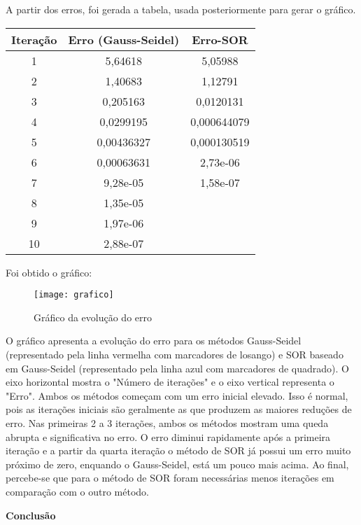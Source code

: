 \documentclass[12pt,a4paper,openany,oneside]{abntex2}
\begin{document}
A partir dos erros, foi gerada a tabela, usada posteriormente para gerar o gráfico.
\begin{center}
    \begin{tabular}{|c|c|c|}
\hline
Iteração & Erro (Gauss-Seidel) & Erro-SOR \\ \hline
1   & 5,64618   & 5,05988   \\ \hline
2   & 1,40683   & 1,12791   \\ \hline
3   & 0,205163  & 0,0120131 \\ \hline
4   & 0,0299195 & 0,000644079 \\ \hline
5   & 0,00436327 & 0,000130519 \\ \hline
6   & 0,00063631 & 2,73e-06 \\ \hline
7   & 9,28e-05   & 1,58e-07 \\ \hline
8   & 1,35e-05   &         \\ \hline
9   & 1,97e-06 & \\ \hline
10  & 2,88e-07 & \\ \hline
\end{tabular}
\end{center}

Foi obtido o gráfico:

\begin{figure}[!h]  %
    \centering       %
    \texttt{[image: grafico]} %
    \caption{Gráfico da evolução do erro}
    \label{fig:minha_imagem}
\end{figure}

O gráfico apresenta a evolução do erro para os métodos Gauss-Seidel (representado pela linha vermelha com marcadores de losango) e SOR baseado em Gauss-Seidel (representado pela linha azul com marcadores de quadrado). O eixo horizontal mostra o "Número de iterações" e o eixo vertical representa o "Erro".
Ambos os métodos começam com um erro inicial elevado. Isso é normal, pois as iterações iniciais são geralmente as que produzem as maiores reduções de erro. Nas primeiras 2 a 3 iterações, ambos os métodos mostram uma queda abrupta e significativa no erro. O erro diminui rapidamente após a primeira iteração e a partir da quarta iteração
o método de SOR já possui um erro muito próximo de zero, enquando o Gauss-Seidel, está um pouco mais acima. Ao final, percebe-se que para o método de SOR foram necessárias menos iterações em comparação com o outro método.

\begin{center}
    \textbf{\large Conclusão}
\end{center}
\end{document}
